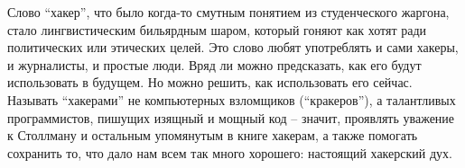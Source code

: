 Слово \enquote{хакер}, что было когда-то смутным понятием из студенческого жаргона, стало лингвистическим бильярдным шаром, который гоняют как хотят ради политических или этических целей. Это слово любят употреблять и сами хакеры, и журналисты, и простые люди. Вряд ли можно предсказать, как его будут использовать в будущем. Но можно решить, как использовать его сейчас. Называть \enquote{хакерами} не компьютерных взломщиков (\enquote{кракеров}), а талантливых программистов, пишущих изящный и мощный код -- значит, проявлять уважение к Столлману и остальным упомянутым в книге хакерам, а также помогать сохранить то, что дало нам всем так много хорошего: настоящий хакерский дух.
